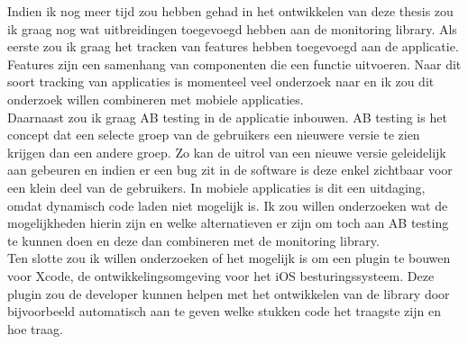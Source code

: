 Indien ik nog meer tijd zou hebben gehad in het ontwikkelen van deze thesis zou ik graag nog wat uitbreidingen toegevoegd hebben aan de monitoring library. Als eerste zou ik graag het tracken van features hebben toegevoegd aan de applicatie. Features zijn een samenhang van componenten die een functie uitvoeren. Naar dit soort tracking van applicaties is momenteel veel onderzoek naar en ik zou dit onderzoek willen combineren met mobiele applicaties. \\
Daarnaast zou ik graag AB testing in de applicatie inbouwen. AB testing is het concept dat een selecte groep van de gebruikers een nieuwere versie te zien krijgen dan een andere groep. Zo kan de uitrol van een nieuwe versie geleidelijk aan gebeuren en indien er een bug zit in de software is deze enkel zichtbaar voor een klein deel van de gebruikers. In mobiele applicaties is dit een uitdaging, omdat dynamisch code laden niet mogelijk is. Ik zou willen onderzoeken wat de mogelijkheden hierin zijn en welke alternatieven er zijn om toch aan AB testing te kunnen doen en deze dan combineren met de monitoring library.\\
Ten slotte zou ik willen onderzoeken of het mogelijk is om een plugin te bouwen voor Xcode, de ontwikkelingsomgeving voor het iOS besturingssysteem. Deze plugin zou de developer kunnen helpen met het ontwikkelen van de library door bijvoorbeeld automatisch aan te geven welke stukken code het traagste zijn en hoe traag. \\
 
